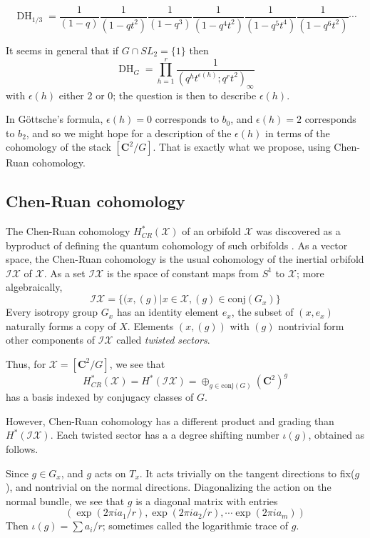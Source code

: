 \documentclass{amsart}[12pt]
\theoremstyle{definition}
\newcommand{\C}{\mathbf{C}}
\DeclareMathOperator{\DC}{DH}
\begin{document}
$$\DC_{1/3}=\frac{1}{(1-q)}\frac{1}{(1-qt^2)}\frac{1}{(1-q^3)}\frac{1}{(1-q^4t^2)}
\frac{1}{(1-q^5t^4)}\frac{1}{(1-q^6t^2)}\cdots$$

 It seems in general that if $G\cap SL_2=\{1\}$ then
$$\DC_{G}=\prod_{h=1}^r \frac{1}{(q^h t^{\epsilon(h)}; q^r t^2)_\infty}$$
with $\epsilon(h)$ either 2 or 0; the question is then to describe $\epsilon(h)$.

In G\"ottsche's formula, $\epsilon(h)=0$ corresponds to $b_0$, and $\epsilon(h)=2$ corresponds to $b_2$, and so we might hope for a description of the $\epsilon(h)$ in terms of the cohomology of the stack $[\C^2/G]$.  That is exactly what we propose, using Chen-Ruan cohomology.



\subsection{Chen-Ruan cohomology}

The Chen-Ruan cohomology $H_{CR}^*(\mathcal{X})$ of an orbifold $\mathcal{X}$ was discovered as a byproduct of defining the quantum cohomology of such orbifolds \cite{chenruancohomology}.  As a vector space, the Chen-Ruan cohomology is the usual cohomology of the inertial orbifold $\mathcal{IX}$ of $\mathcal{X}$.  As a set $\mathcal{IX}$ is the space of constant maps from $S^1$ to $\mathcal{X}$; more algebraically, 
$$\mathcal{IX}=\{(x, (g)| x\in \mathcal{X}, (g)\in\textrm{conj}(G_x)\}$$
Every isotropy group $G_x$ has an identity element $e_x$, the subset of $(x, e_x)$ naturally forms a copy of $X$.  Elements $(x,(g))$ with $(g)$ nontrivial form other components of $\mathcal{IX}$ called \emph{twisted sectors}.

Thus, for $\mathcal{X}=[\C^2/G]$, we see that 
$$H_{CR}^*(\mathcal{X}) =H^*(\mathcal{IX})=\oplus_{g\in\textrm{conj}(G)} (\C^2)^g$$
has a basis indexed by conjugacy classes of $G$.

However, Chen-Ruan cohomology has a different product and grading than $H^*(\mathcal{IX})$.  Each twisted sector has a a degree shifting number $\iota(g)$, obtained as follows.

Since $g\in G_x$, and $g$ acts on $T_x$.  It acts trivially on the tangent directions to fix($g$), and nontrivial on the normal directions.  Diagonalizing the action on the normal bundle, we see that $g$ is a diagonal matrix with entries 
$$(\exp(2\pi i a_1/r), \exp(2\pi i a_2/r), \cdots \exp(2\pi i a_m))$$
Then $\iota(g)=\sum a_i/r$; sometimes called the logarithmic trace of $g$.
\end{document}
